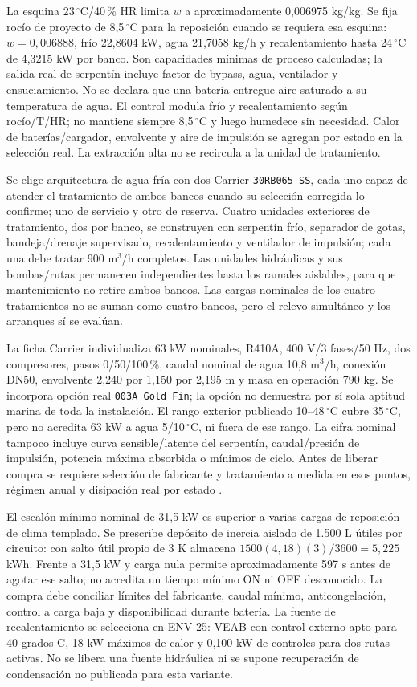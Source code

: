 La esquina 23\,$^{\circ}$C/40\,\% HR limita $w$ a aproximadamente 0,006975 kg/kg. Se fija rocío de proyecto de 8,5\,$^{\circ}$C para la reposición cuando se requiera esa esquina: $w=0,006888$, frío 22,8604 kW, agua 21,7058 kg/h y recalentamiento hasta 24\,$^{\circ}$C de 4,3215 kW por banco. Son capacidades mínimas de proceso calculadas; la salida real de serpentín incluye factor de bypass, agua, ventilador y ensuciamiento. No se declara que una batería entregue aire saturado a su temperatura de agua. El control modula frío y recalentamiento según rocío/T/HR; no mantiene siempre 8,5\,$^{\circ}$C y luego humedece sin necesidad. Calor de baterías/cargador, envolvente y aire de impulsión se agregan por estado en la selección real. La extracción alta no se recircula a la unidad de tratamiento.

Se elige arquitectura de agua fría con dos Carrier \texttt{30RB065-SS}, cada uno capaz de atender el tratamiento de ambos bancos cuando su selección corregida lo confirme; uno de servicio y otro de reserva. Cuatro unidades exteriores de tratamiento, dos por banco, se construyen con serpentín frío, separador de gotas, bandeja/drenaje supervisado, recalentamiento y ventilador de impulsión; cada una debe tratar 900 m$^3$/h completos. Las unidades hidráulicas y sus bombas/rutas permanecen independientes hasta los ramales aislables, para que mantenimiento no retire ambos bancos. Las cargas nominales de los cuatro tratamientos no se suman como cuatro bancos, pero el relevo simultáneo y los arranques sí se evalúan.

La ficha Carrier individualiza 63 kW nominales, R410A, 400 V/3 fases/50 Hz, dos compresores, pasos 0/50/100\,\%, caudal nominal de agua 10,8 m$^3$/h, conexión DN50, envolvente 2,240 por 1,150 por 2,195 m y masa en operación 790 kg. Se incorpora opción real \texttt{003A Gold Fin}; la opción no demuestra por sí sola aptitud marina de toda la instalación. El rango exterior publicado 10--48\,$^{\circ}$C cubre 35\,$^{\circ}$C, pero no acredita 63 kW a agua 5/10\,$^{\circ}$C, ni fuera de ese rango. La cifra nominal tampoco incluye curva sensible/latente del serpentín, caudal/presión de impulsión, potencia máxima absorbida o mínimos de ciclo. Antes de liberar compra se requiere selección de fabricante y tratamiento a medida en esos puntos, régimen anual y disipación real por estado \parencite[pp.~6--8 y 11]{lote19-carrier-30rb065}.

El escalón mínimo nominal de 31,5 kW es superior a varias cargas de reposición de clima templado. Se prescribe depósito de inercia aislado de 1.500 L útiles por circuito: con salto útil propio de 3 K almacena $1500(4,18)(3)/3600=5,225$ kWh. Frente a 31,5 kW y carga nula permite aproximadamente 597 s antes de agotar ese salto; no acredita un tiempo mínimo ON ni OFF desconocido. La compra debe conciliar límites del fabricante, caudal mínimo, anticongelación, control a carga baja y disponibilidad durante batería. La fuente de recalentamiento se selecciona en ENV-25: VEAB con control externo apto para 40 grados C, 18 kW máximos de calor y 0,100 kW de controles para dos rutas activas. No se libera una fuente hidráulica ni se supone recuperación de condensación no publicada para esta variante.

